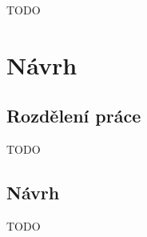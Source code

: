 \documentclass{article}
\begin{document}
TODO

\section{Návrh}

\subsection{Rozdělení práce}

TODO

\subsection{Návrh}

TODO
\end{document}
